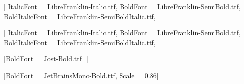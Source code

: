 \usepackage{fontspec}

\setmainfont{LibreFranklin-Regular.ttf}[
  ItalicFont     = LibreFranklin-Italic.ttf,
  BoldFont       = LibreFranklin-SemiBold.ttf,
  BoldItalicFont = LibreFranklin-SemiBoldItalic.ttf,
]

\setsansfont{LibreFranklin-Regular.ttf}[
  ItalicFont     = LibreFranklin-Italic.ttf,
  BoldFont       = LibreFranklin-SemiBold.ttf,
  BoldItalicFont = LibreFranklin-SemiBoldItalic.ttf,
]

\newfontfamily{}[BoldFont = Jost-Bold.ttf]
\newfontfamily{}[]

\setmonofont{JetBrainsMono-Regular.ttf}[BoldFont = JetBrainsMono-Bold.ttf, Scale = 0.86]

